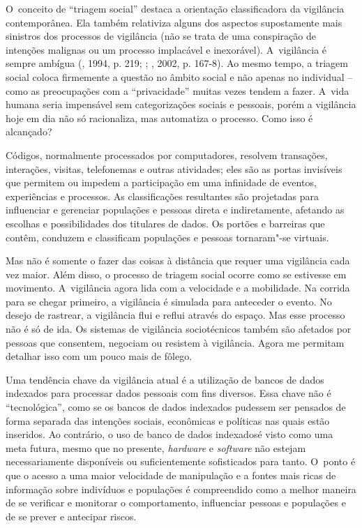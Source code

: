O~conceito de ``triagem social'' destaca a orientação classificadora da
vigilância contemporânea. Ela também relativiza alguns dos aspectos
supostamente mais sinistros dos processos de vigilância (não se trata de
uma conspiração de intenções malignas ou um processo implacável e
inexorável). A~vigilância é sempre ambígua (, 1994, p. 219; ;
, 2002, p. 167-8). Ao mesmo tempo, a triagem social coloca
firmemente a questão no âmbito social e não apenas no individual --
como as preocupações com a ``privacidade'' muitas vezes tendem a fazer.
A~vida humana seria impensável sem categorizações sociais e pessoais,
porém a vigilância hoje em dia não só racionaliza, mas automatiza o
processo. Como isso é alcançado?

Códigos, normalmente processados por computadores, resolvem transações,
interações, visitas, telefonemas e outras atividades; eles são as portas
invisíveis que permitem ou impedem a participação em uma infinidade de
eventos, experiências e processos. As classificações resultantes são
projetadas para influenciar e gerenciar populações e pessoas direta e
indiretamente, afetando as escolhas e possibilidades dos titulares de
dados. Os portões e barreiras que contêm, conduzem e classificam
populações e pessoas tornaram"-se virtuais.

Mas não é somente o fazer das coisas à distância que requer uma
vigilância cada vez maior. Além disso, o processo de triagem social
ocorre como se estivesse em movimento. A~vigilância agora lida com a
velocidade e a mobilidade. Na corrida para se chegar primeiro, a
vigilância é simulada para anteceder o evento. No desejo de rastrear, a
vigilância flui e reflui através do espaço. Mas esse processo não é só
de ida. Os sistemas de vigilância sociotécnicos também são afetados por
pessoas que consentem, negociam ou resistem à vigilância. Agora me
permitam detalhar isso com um pouco mais de fôlego.

Uma tendência chave da vigilância atual é a utilização de bancos de
dados indexados para processar dados pessoais com fins diversos. Essa
chave não é ``tecnológica'', como se os bancos de dados indexados
pudessem ser pensados de forma separada das intenções sociais,
econômicas e políticas nas quais estão inseridos. Ao contrário, o uso de
banco de dados indexadosé visto como uma meta futura, mesmo que no
presente, \emph{hardware} e \emph{software} não estejam necessariamente
disponíveis ou suficientemente sofisticados para tanto. O~ponto é que o
acesso a uma maior velocidade de manipulação e a fontes mais ricas de
informação sobre indivíduos e populações é compreendido como a melhor
maneira de se verificar e monitorar o comportamento, influenciar pessoas
e populações e de se prever e antecipar riscos.


